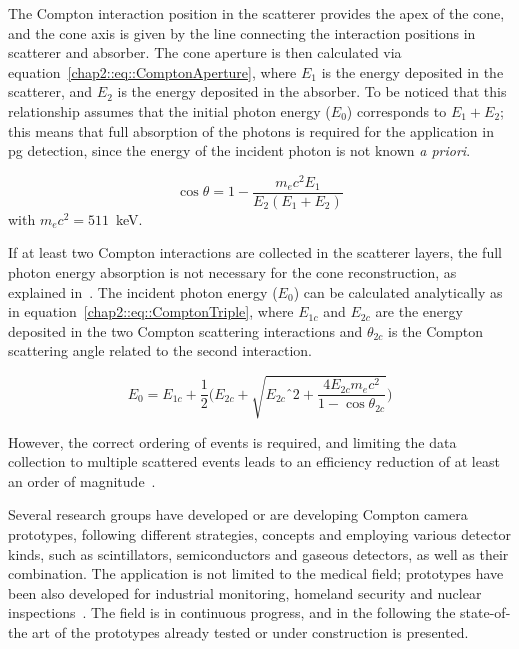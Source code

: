 The Compton interaction position in the scatterer provides the apex of the cone, and the cone axis is given by the line connecting the interaction positions in scatterer and absorber. The cone aperture is then calculated via equation~\ref{chap2::eq::ComptonAperture}, where $E_1$ is the energy deposited in the scatterer, and $E_2$ is the energy deposited in the absorber. To be noticed that this relationship assumes that the initial photon energy ($E_0$) corresponds to $E_1 + E_2$; this means that full absorption of the photons is required for the application in \gls{pg} detection, since the energy of the incident photon is not known \textit{a priori}. 

\begin{equation}
\cos{\theta} = 1 - \frac{m_ec^2E_ 1}{E_2(E_1+E_2)} 
\label{chap2::eq::ComptonAperture}
\end{equation} 
with $m_{e}c^{2} = 511$~keV.

If at least two Compton interactions are collected in the scatterer layers, the full photon energy absorption is not necessary for the cone reconstruction, as explained in~\parencite{Kurfess2000}. The incident photon energy ($E_0$) can be calculated analytically as in equation~\ref{chap2::eq::ComptonTriple}, where $E_{1c}$ and $E_{2c}$ are the energy deposited in the two Compton scattering interactions and $\theta_{2c}$ is the Compton scattering angle related to the second interaction. 

\begin{equation}
E_0 = E_{1c} + \frac{1}{2}\bigg(E_{2c} + \sqrt{E_{2c}ˆ2+\frac{4E_{2c}m_ec^2}{1-\cos\theta_{2c}}}\bigg) 
\label{chap2::eq::ComptonTriple}
\end{equation} 

However, the correct ordering of events is required, and limiting the data collection to multiple scattered events leads to an efficiency reduction of at least an order of magnitude~\parencite{Roellinghoff2011}.

Several research groups have developed or are developing Compton camera prototypes, following different strategies, concepts and employing various detector kinds, such as scintillators, semiconductors and gaseous detectors, as well as their combination. The application is not limited to the medical field; prototypes have been also developed for industrial monitoring, homeland security and nuclear inspections~\parencite{Martin1994, McKisson1994}. The field is in continuous progress, and in the following the state-of-the art of the prototypes already tested or under construction is presented.

